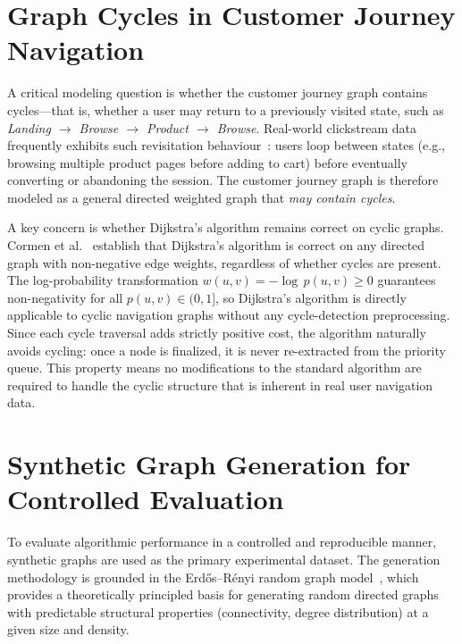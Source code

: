 \section{Graph Cycles in Customer Journey Navigation}

A critical modeling question is whether the customer journey graph contains cycles---that is, whether a user may return to a previously visited state, such as \textit{Landing $\to$ Browse $\to$ Product $\to$ Browse}. Real-world clickstream data frequently exhibits such revisitation behaviour~\citep{bucklin2003clickstream}: users loop between states (e.g., browsing multiple product pages before adding to cart) before eventually converting or abandoning the session. The customer journey graph is therefore modeled as a general directed weighted graph that \emph{may contain cycles}.

A key concern is whether Dijkstra's algorithm remains correct on cyclic graphs. Cormen et al.~\citep{cormen2009} establish that Dijkstra's algorithm is correct on any directed graph with non-negative edge weights, regardless of whether cycles are present. The log-probability transformation $w(u,v) = -\log\,p(u,v) \geq 0$ guarantees non-negativity for all $p(u,v) \in (0,1]$, so Dijkstra's algorithm is directly applicable to cyclic navigation graphs without any cycle-detection preprocessing. Since each cycle traversal adds strictly positive cost, the algorithm naturally avoids cycling: once a node is finalized, it is never re-extracted from the priority queue. This property means no modifications to the standard algorithm are required to handle the cyclic structure that is inherent in real user navigation data.

\section{Synthetic Graph Generation for Controlled Evaluation}

To evaluate algorithmic performance in a controlled and reproducible manner, synthetic graphs are used as the primary experimental dataset. The generation methodology is grounded in the Erd\H{o}s--R\'{e}nyi random graph model~\citep{erdosrenyi1960}, which provides a theoretically principled basis for generating random directed graphs with predictable structural properties (connectivity, degree distribution) at a given size and density.

